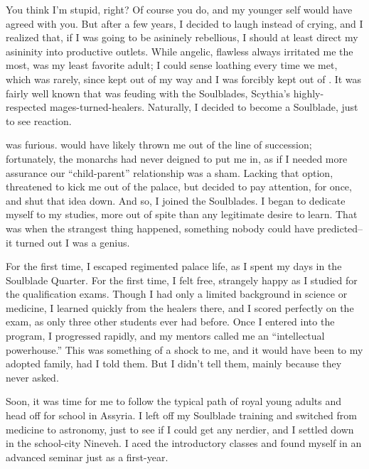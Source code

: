 \documentclass[char]{Kos}
\begin{document}
You think I'm stupid, right? Of course you do, and my younger self would have agreed with you. But after a few years, I decided to laugh instead of crying, and I realized that, if I was going to be asininely rebellious, I should at least direct my asininity into productive outlets. While angelic, flawless \cBride{} always irritated me the most, \cBride{\their} \cScythiaQueen{\parent} \cScythiaQueen{} was my least favorite adult; I could sense \cScythiaQueen{\their} loathing every time we met, which was rarely, since \cScythiaQueen{\they} kept out of my way and I was forcibly kept out of \cScythiaQueen{\theirs}. It was fairly well known that \cScythiaQueen{\they} was feuding with the Soulblades, Scythia's highly-respected mages-turned-healers. Naturally, I decided to become a Soulblade, just to see \cScythiaQueen{\their} reaction.

\cScythiaQueen{\They} was furious. \cScythiaQueen{\They} would have likely thrown me out of the line of succession; fortunately, the monarchs had never deigned to put me in, as if I needed more assurance our ``child-parent'' relationship was a sham. Lacking that option, \cScythiaQueen{\they} threatened to kick me out of the palace, but \cScythiaQueen{\their} \cScythiaKing{\spouse} decided to pay attention, for once, and shut that idea down. And so, I joined the Soulblades. I began to dedicate myself to my studies, more out of spite than any legitimate desire to learn. That was when the strangest thing happened, something nobody could have predicted-- it turned out I was a genius.

For the first time, I escaped regimented palace life, as I spent my days in the Soulblade Quarter. For the first time, I felt free, strangely happy as I studied for the qualification exams. Though I had only a limited background in science or medicine, I learned quickly from the healers there, and I scored perfectly on the exam, as only three other students ever had before. Once I entered into the program, I progressed rapidly, and my mentors called me an ``intellectual powerhouse.'' This was something of a shock to me, and it would have been to my adopted family, had I told them. But I didn't tell them, mainly because they never asked.

Soon, it was time for me to follow the typical path of royal young adults and head off for school in Assyria. I left off my Soulblade training and switched from medicine to astronomy, just to see if I could get any nerdier, and I settled down in the school-city Nineveh. I aced the introductory classes and found myself in an advanced seminar just as a first-year. 
\end{document}
